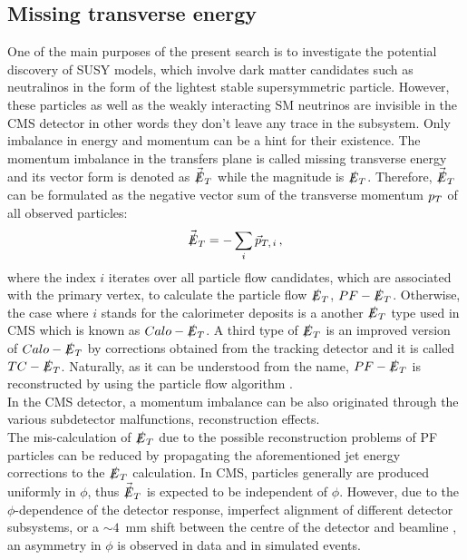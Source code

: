 \subsection{Missing transverse energy}
One of the main purposes of the present search is to investigate the potential discovery of SUSY models, which involve dark matter candidates such as neutralinos in the form of the lightest stable supersymmetric particle. However, these particles as well as the weakly interacting SM neutrinos are invisible in the CMS detector in other words they don’t leave any trace in the subsystem. Only imbalance in energy and momentum can be a hint for their existence. The momentum imbalance in the transfers plane is called missing transverse energy and its vector form is denoted as $\vec{\slashed{E}}_T$ while the magnitude is $\slashed{E}_T$. Therefore, $\vec{\slashed{E}}_T$ can be formulated as the negative vector sum of the transverse momentum $p_T$ of all observed particles:
 \begin{eqnarray}
 \label{Eqn:MET}
{\ensuremath{\vec{\slashed{E}}_T}=  -\sum_i\ensuremath{\vec{p}_{T,\,i}}}\,,
\end{eqnarray}
where the index $i$ iterates over all particle flow candidates, which are associated with the primary vertex, to calculate the particle flow $\slashed{E}_T$, $PF-\slashed{E}_T$. Otherwise, the case where $i$ stands for the calorimeter deposits is a another $\slashed{E}_T$ type used in CMS which is known as $Calo-\slashed{E}_T$. A third type of $\slashed{E}_T$ is an improved version of $Calo-\slashed{E}_T$ by corrections obtained from the tracking detector and it is called $TC-\slashed{E}_T$.
Naturally, as it can be understood from the name, $PF-\slashed{E}_T$ is reconstructed by using the particle flow algorithm \cite{MET}. \\
In the CMS detector, a momentum imbalance can be also originated through the various subdetector malfunctions, reconstruction effects. \\
The mis-calculation of $\slashed{E}_T$ due to the possible reconstruction problems of PF particles can be reduced by propagating the aforementioned jet energy corrections to the $\slashed{E}_T$ calculation.
In CMS, particles generally are produced uniformly in $\phi$, thus $\vec{\slashed{E}}_T$ is expected to be independent of $\phi$. However, due to the $\phi$-dependence of the detector response, imperfect alignment of different detector subsystems, or a $\sim4$~mm shift between the centre of the detector and beamline \cite{CMS-PAS-TRK-10-003}, an asymmetry in $\phi$ is observed in data and in simulated events.\\
